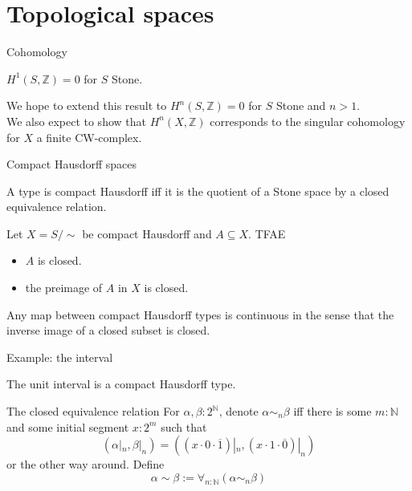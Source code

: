 \section{Topological spaces}
\begin{frame}{Cohomology}%
  \pause 
    \begin{lemma}
      $H^1(S,\mathbb Z) = 0$ for $S$ Stone.
    \end{lemma}
    \pause 
    We hope to extend this result to 
      $H^n(S,\mathbb Z) = 0$ for $S$ Stone and $n>1$.
      \pause
      \\
      We also expect to show that $H^n(X,\mathbb Z)$ corresponds to the singular cohomology 
      for $X$ a finite CW-complex.\\
\end{frame}
\begin{frame}{Compact Hausdorff spaces}
  \begin{definition}
    A type is compact Hausdorff iff it is the quotient of a 
    Stone space by a closed equivalence relation. 
  \end{definition}
  \pause
  \begin{lemma}
    Let $X = S / \sim $ be compact Hausdorff and $A\subseteq X$. TFAE
    \begin{itemize}
      \item $A$ is closed. 
      \item the preimage of $A$ in $X$ is closed. 
    \end{itemize}
\end{lemma}
\pause
  \begin{corollary}
    Any map between compact Hausdorff types is 
    continuous in the sense that the 
    inverse image of a closed subset is closed. 
  \end{corollary}
\end{frame}


\begin{frame}{Example: the interval}
  \begin{lemma}
    The unit interval is a compact Hausdorff type. 
  \end{lemma}
  \begin{block}{The closed equivalence relation}
  For $\alpha,\beta:2^\mathbb N$, 
  \pause denote 
      $\alpha \sim_n \beta$ iff 
      \pause 
      there is some $m:\mathbb N$ and some 
      initial segment $x:2^m$ such that 
      \pause
      \vspace{-0.2cm}
      $$
      (\alpha|_n,\beta|_n)= 
      ( 
        (x \cdot 0 \cdot \overline 1)|_n , 
        (x \cdot 1 \cdot \overline 0)|_n
        ) 
      $$
      \vspace{-0.4cm}
      or the other way around. 
      \pause 
      Define 
      $$\alpha\sim\beta := \forall_{n:\mathbb N} (\alpha \sim_n \beta)$$
    \end{block}
\end{frame}

